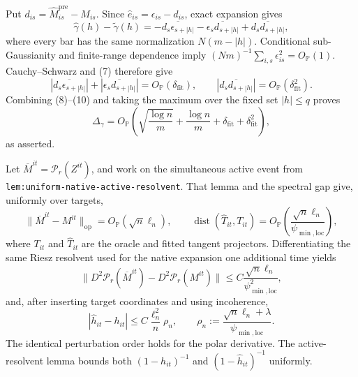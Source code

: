 Put \(d_{is}=\widehat M^{\mathrm{pre}}_{is}-M_{is}\).  Since \(\widehat e_{is}=\epsilon_{is}-d_{is}\), exact expansion gives
\[
 \widehat\gamma(h)-\widetilde\gamma(h)
 =-\overline{d_s\epsilon_{s+|h|}}
  -\overline{\epsilon_sd_{s+|h|}}
  +\overline{d_sd_{s+|h|}},
 \tag{9}
\]
where every bar has the same normalization \(N(m-|h|)\).  Conditional sub-Gaussianity and finite-range dependence imply \((Nm)^{-1}\sum_{i,s}\epsilon_{is}^2=O_{\mathbb P}(1)\).  Cauchy--Schwarz and (7) therefore give
\[
 |\overline{d_s\epsilon_{s+|h|}}|
 +|\overline{\epsilon_sd_{s+|h|}}|
 =O_{\mathbb P}(\delta_{\mathrm{fit}}),
 \qquad
 |\overline{d_sd_{s+|h|}}|
 =O_{\mathbb P}(\delta_{\mathrm{fit}}^2).
 \tag{10}
\]
Combining (8)--(10) and taking the maximum over the fixed set \(|h|\le q\) proves
\[
 \Delta_\gamma=O_{\mathbb P}\!\left(
 \sqrt{\frac{\log n}{m}}+\frac{\log n}{m}
 +\delta_{\mathrm{fit}}+\delta_{\mathrm{fit}}^2\right),
\]
as asserted.

Let \(\overline M^{it}=\mathcal P_r(Z^{it})\), and work on the simultaneous active event from \texttt{lem:uniform-native-active-resolvent}.  That lemma and the spectral gap give, uniformly over targets,
\[
 \|\overline M^{it}-M^{it}\|_{\mathrm{op}}
 =O_{\mathbb P}(\sqrt n\ell_n),
 \qquad
 \operatorname{dist}(\widehat T_{it},T_{it})
 =O_{\mathbb P}\!\left(
 \frac{\sqrt n\ell_n}{\psi_{\min,\mathrm{loc}}}\right),
 \tag{1}
\]
where \(T_{it}\) and \(\widehat T_{it}\) are the oracle and fitted tangent projectors.  Differentiating the same Riesz resolvent used for the native expansion one additional time yields
\[
 \|D^2\mathcal P_r(\overline M^{it})
       -D^2\mathcal P_r(M^{it})\|
 \le C\frac{\sqrt n\ell_n}{\psi_{\min,\mathrm{loc}}^2},
 \tag{2}
\]
and, after inserting target coordinates and using incoherence,
\[
 |\widehat h_{it}-h_{it}|
 \le C\frac{\ell_n^2}{n}\rho_n,
 \qquad
 \rho_n:=\frac{\sqrt n\ell_n+\lambda}{\psi_{\min,\mathrm{loc}}}.
 \tag{3}
\]
The identical perturbation order holds for the polar derivative.  The active-resolvent lemma bounds both \((1-h_{it})^{-1}\) and \((1-\widehat h_{it})^{-1}\) uniformly.

